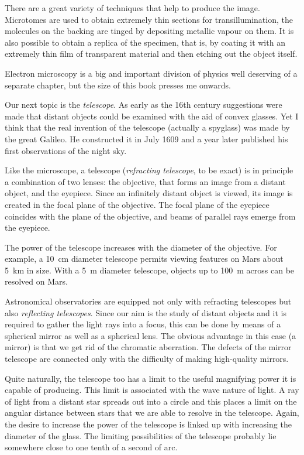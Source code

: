 There are a great variety of techniques that help to produce the image. Microtomes are used to obtain ex­tremely thin sections for transillumination, the molecules on the backing are tinged by depositing metallic vapour on them. It is also possible to obtain a replica of the speci­men, that is, by coating it with an extremely thin film of transparent material and then etching out the object itself.

Electron microscopy is a big and important division of physics well deserving of a separate chapter, but the size of this book presses me onwards.

Our next topic is the \emph{telescope}. As early as the 16th century suggestions were made that distant objects could be examined with the aid of convex glasses. Yet I think that the real invention of the telescope (actually a spyglass) was made by the great Galileo. He constructed it in July 1609 and a year later published his first obser­vations of the night sky.

Like the microscope, a telescope (\emph{refracting telescope}, to be exact) is in principle a combination of two lenses: the objective, that forms an image from a distant object, and the eyepiece. Since an infinitely distant object is viewed, its image is created in the focal plane of the objec­tive. The focal plane of the eyepiece coincides with the plane of the objective, and beams of parallel rays emerge from the eyepiece.

The power of the telescope increases with the diameter of the objective. For example, a \SI{10}{\centi\meter} diameter telescope permits viewing features on Mars about \SI{5}{\kilo\meter} in size. With a \SI{5}{\meter} diameter telescope, objects up to \SI{100}{\meter} across can be resolved on Mars.

Astronomical observatories are equipped not only with refracting telescopes but also \emph{reflecting telescopes}. Since our aim is the study of distant objects and it is required to gather the light rays into a focus, this can be done by means of a spherical mirror as well as a spherical lens. The obvious advantage in this case (a mirror) is that we get rid of the chromatic aberration. The defects of the mirror telescope are connected only with the difficulty of making high-quality mirrors.

Quite naturally, the telescope too has a limit to the useful magnifying power it is capable of producing. This limit is associated with the wave nature of light. A ray of light from a distant star spreads out into a circle and this places a limit on the angular distance between stars that we are able to resolve in the telescope. Again, the desire to increase the power of the telescope is linked up with increasing the diameter of the glass. The limiting possibilities of the telescope probably lie somewhere close to one tenth of a second of arc.


